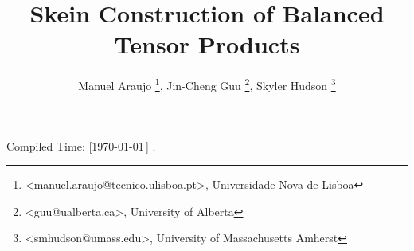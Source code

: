 \title{Skein Construction of Balanced Tensor Products} \author{Manuel Araujo
  \thanks{<manuel.araujo@tecnico.ulisboa.pt>, Universidade Nova de Lisboa},
  Jin-Cheng Guu \thanks{<guu@ualberta.ca>, University of Alberta}, Skyler
  Hudson \thanks{<smhudson@umass.edu>, University of Massachusetts Amherst}}
\date{}

\newcommand{\III}[9]{%
  {}^{#1}_{#2} I^{#3}_{#4}
  \left(
    \begin{matrix}
      #5 \\ {}\\ #6
    \end{matrix}
    \,\middle|\,
    \begin{matrix}
      #7 \\ #8 \\ #9
    \end{matrix}
  \right)
}
\newcommand{\II}[7]{%
  {}^{#1}_{#2} I^{#3}_{#4}
  \left( #5, #6
    \,\middle|\,
    #7
  \right)
}



\maketitle
\begin{flushright}
  \tiny{Compiled Time: [\today\,\DTMcurrenttime]} \quad\qquad.
\end{flushright}


\tableofcontents

